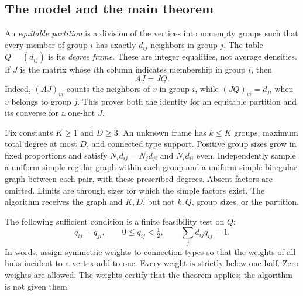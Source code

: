 \documentclass[11pt]{article}
\theoremstyle{definition}
\theoremstyle{remark}
\newcommand{\1}{\mathbf 1}
\begin{document}
\subsection{The model and the main theorem}
An \emph{equitable partition} is a division of the vertices into nonempty
groups such that every member of group $i$ has exactly $d_{ij}$ neighbors
in group $j$. The table $Q=(d_{ij})$ is its \emph{degree frame}. These are
integer equalities, not average densities. If $J$ is the matrix whose
$i$th column indicates membership in group $i$, then
\[
                         AJ=JQ.
\]
Indeed, $(AJ)_{vi}$ counts the neighbors of $v$ in group $i$, while
$(JQ)_{vi}=d_{ji}$ when $v$ belongs to group $j$. This proves both the
identity for an equitable partition and its converse for a one-hot $J$.

Fix constants $K\ge1$ and $D\ge3$. An unknown frame has $k\le K$ groups,
maximum total degree at most $D$, and connected type support. Positive
group sizes grow in fixed proportions and satisfy
$N_id_{ij}=N_jd_{ji}$ and $N_id_{ii}$ even. Independently sample a uniform
simple regular graph within each group and a uniform simple biregular
graph between each pair, with these prescribed degrees. Absent factors
are omitted. Limits are through sizes for which the simple factors exist.
The algorithm receives the graph and $K,D$, but not $k,Q$, group sizes,
or the partition.

The following sufficient condition is a finite feasibility test on $Q$:
\begin{equation}\label{eq:overview-certificate}
 q_{ij}=q_{ji},\qquad 0\le q_{ij}<\tfrac12,\qquad
                     \sum_jd_{ij}q_{ij}=1.
\end{equation}
In words, assign symmetric weights to connection types so that the
weights of all links incident to a vertex add to one. Every weight is
strictly below one half. Zero weights are allowed. The weights certify
that the theorem applies; the algorithm is not given them.
\end{document}
